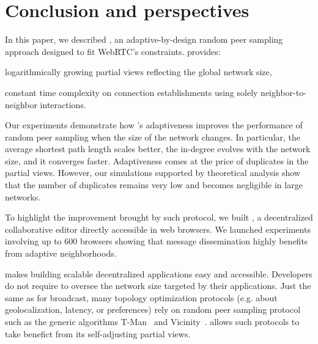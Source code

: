 
\section{Conclusion and perspectives}
\label{sec:conclusion}



In this paper, we described \SPRAY, an adaptive-by-design random peer sampling
approach designed to fit WebRTC's constraints.  \SPRAY provides:
\begin{inparaenum}[(i)]
\item logarithmically growing partial views reflecting the global network size,
\item constant time complexity on connection establishments using solely
  neighbor-to-neighbor interactions.
\end{inparaenum}
Our experiments demonstrate how \SPRAY's adaptiveness improves the performance
of random peer sampling when the size of the network changes. In particular, the
average shortest path length scales better, the in-degree evolves with the
network size, and it converges faster.  Adaptiveness comes at the price of
duplicates in the partial views. However, our simulations supported by
theoretical analysis show that the number of duplicates remains very low and
becomes negligible in large networks.

To highlight the improvement brought by such protocol, we built \CRATE, a
decentralized collaborative editor directly accessible in web browsers. We
launched experiments involving up to 600 browsers showing that message
dissemination highly benefits from adaptive neighborhoods.

\SPRAY makes building scalable decentralized applications easy and accessible.
Developers do not require to oversee the network size targeted by their
applications. Just the same as for broadcast, many topology optimization
protocols (e.g. about geolocalization, latency, or preferences) rely on random
peer sampling protocol such as the generic algorithms
T-Man~\cite{jelasity2009tman} and Vicinity~\cite{voulgaris2005epidemic}. \SPRAY
allows such protocols to take benefict from its self-adjusting partial views.

